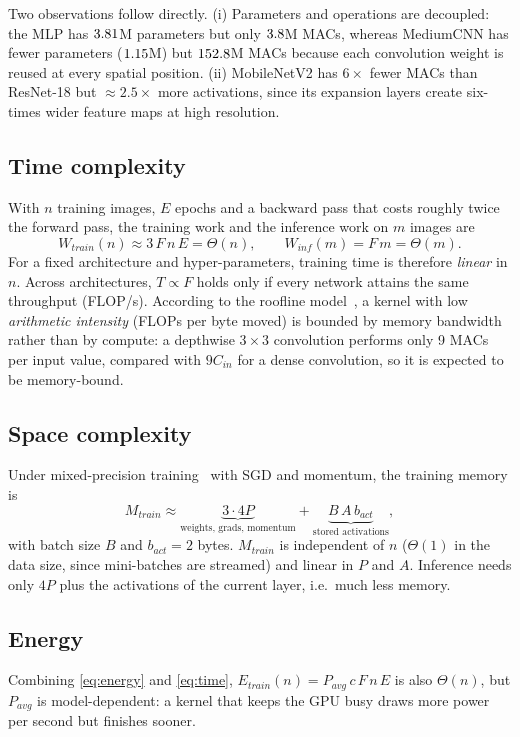\documentclass[conference]{IEEEtran}
\begin{document}
Two observations follow directly. (i) Parameters and operations are decoupled: the MLP has
$3.81$M parameters but only $3.8$M MACs, whereas MediumCNN has fewer parameters ($1.15$M) but
$152.8$M MACs because each convolution weight is reused at every spatial position.
(ii) MobileNetV2 has $6\times$ fewer MACs than ResNet-18 but $\approx2.5\times$ more activations, since its
expansion layers create six-times wider feature maps at high resolution.

\subsection{Time complexity}
With $n$ training images, $E$ epochs and a backward pass that costs roughly twice the forward pass, the training work
and the inference work on $m$ images are
\begin{equation}
W_{train}(n) \approx 3\,F\,n\,E = \Theta(n), \qquad W_{inf}(m) = F\,m = \Theta(m).
\label{eq:time}
\end{equation}
For a fixed architecture and hyper-parameters, training time is therefore \emph{linear} in $n$. Across architectures,
$T\propto F$ holds only if every network attains the same throughput (FLOP/s). According to the roofline
model~\cite{williams2009roofline}, a kernel with low \emph{arithmetic intensity} (FLOPs per byte moved) is bounded
by memory bandwidth rather than by compute: a depthwise $3\times3$ convolution performs only 9 MACs per input value,
compared with $9C_{in}$ for a dense convolution, so it is expected to be memory-bound.

\subsection{Space complexity}
Under mixed-precision training~\cite{micikevicius2018mixed} with SGD and momentum, the training memory is
\begin{equation}
M_{train} \approx \underbrace{3\cdot4P}_{\text{weights, grads, momentum}} + \underbrace{B\,A\,b_{act}}_{\text{stored activations}},
\label{eq:mem}
\end{equation}
with batch size $B$ and $b_{act}=2$ bytes. $M_{train}$ is independent of $n$ ($\Theta(1)$ in the data size, since
mini-batches are streamed) and linear in $P$ and $A$. Inference needs only $4P$ plus the activations of the
current layer, i.e.\ much less memory.

\subsection{Energy}
Combining \eqref{eq:energy} and \eqref{eq:time}, $E_{train}(n)=P_{avg}\,c\,F\,n\,E$ is also $\Theta(n)$, but
$P_{avg}$ is model-dependent: a kernel that keeps the GPU busy draws more power per second but finishes sooner.
\end{document}
